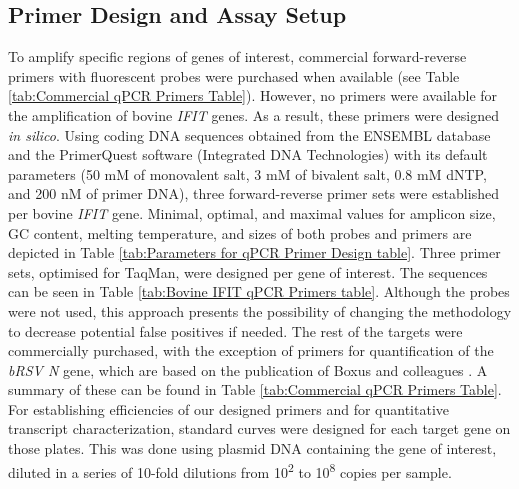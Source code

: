 \subsection{Primer Design and Assay Setup} \label{subsec:Primer Design and Assay Setup}
To amplify specific regions of genes of interest, commercial forward-reverse primers with fluorescent probes were purchased when available (see Table \ref{tab:Commercial qPCR Primers Table}). However, no primers were available for the amplification of bovine \textit{IFIT} genes. As a result, these primers were designed \textit{in silico}. Using coding DNA sequences obtained from the ENSEMBL database \cite{Cunningham2022Ensembl2022} and the PrimerQuest software (Integrated DNA Technologies) with its default parameters (50 mM of monovalent salt, 3 mM of bivalent salt, 0.8 mM dNTP, and 200 nM of primer DNA), three forward-reverse primer sets were established per bovine \textit{IFIT} gene. Minimal, optimal, and maximal values for amplicon size, GC content, melting temperature, and sizes of both probes and primers are depicted in Table \ref{tab:Parameters for qPCR Primer Design table}. Three primer sets, optimised for TaqMan, were designed per gene of interest. The sequences can be seen in Table \ref{tab:Bovine IFIT qPCR Primers table}. Although the probes were not used, this approach presents the possibility of changing the methodology to decrease potential false positives if needed. The rest of the targets were commercially purchased, with the exception of primers for quantification of the \textit{bRSV N} gene, which are based on the publication of Boxus and colleagues \cite{Boxus2005RealVirus}. A summary of these can be found in Table \ref{tab:Commercial qPCR Primers Table}. For establishing efficiencies of our designed primers and for quantitative transcript characterization, standard curves were designed for each target gene on those plates. This was done using plasmid DNA containing the gene of interest, diluted in a series of 10-fold dilutions from 10\textsuperscript{2} to 10\textsuperscript{8} copies per sample.

